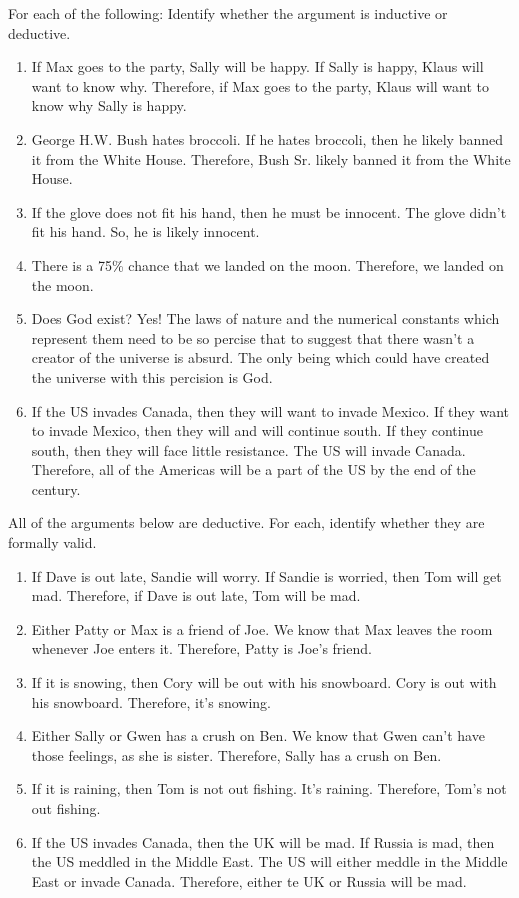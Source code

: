 \practiceproblems
\problempart
\label{pr.typesofargs}
For each of the following: Identify whether the argument is inductive or deductive.
\begin{enumerate}
\item If Max goes to the party, Sally will be happy. If Sally is happy, Klaus will want to know why. Therefore, if Max goes to the party, Klaus will want to know why Sally is happy.
\item George H.W. Bush hates broccoli. If he hates broccoli, then he likely banned it from the White House. Therefore, Bush Sr. likely banned it from the White House.
\item If the glove does not fit his hand, then he must be innocent. The glove didn't fit his hand. So, he is likely innocent. 
\item There is a 75\% chance that we landed on the moon. Therefore, we landed on the moon.
\item Does God exist? Yes! The laws of nature and the numerical constants which represent them need to be so percise that to suggest that there wasn't a creator of the universe is absurd. The only being which could have created the universe with this percision is God. 
\item If the US invades Canada, then they will want to invade Mexico. If they want to invade Mexico, then they will and will continue south. If they continue south, then they will face little resistance. The US will invade Canada. Therefore, all of the Americas will be a part of the US by the end of the century. 
\end{enumerate}

\problempart
\label{pr.validity}
All of the arguments below are deductive. For each, identify whether they are formally valid.
\begin{enumerate}
\item If Dave is out late, Sandie will worry. If Sandie is worried, then Tom will get mad. Therefore, if Dave is out late, Tom will be mad.
\item Either Patty or Max is a friend of Joe. We know that Max leaves the room whenever Joe enters it. Therefore, Patty is Joe's friend.
\item If it is snowing, then Cory will be out with his snowboard. Cory is out with his snowboard. Therefore, it's snowing. 
\item Either Sally or Gwen has a crush on Ben. We know that Gwen can't have those feelings, as she is sister. Therefore, Sally has a crush on Ben.
\item If it is raining, then Tom is not out fishing. It's raining. Therefore, Tom's not out fishing. 
\item If the US invades Canada, then the UK will be mad. If Russia is mad, then the US meddled in the Middle East. The US will either meddle in the Middle East or invade Canada. Therefore, either te UK or Russia will be mad.  
\end{enumerate}

